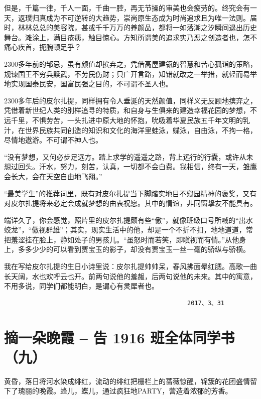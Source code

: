 \documentclass[openany]{ctexbook}
\begin{document}
但是，千篇一律，千人一面，千曲一腔，再无节操的审美也会疲劳的。终究会有一天，返璞归真成为不可逆转的大趋势，崇尚原生态成为时尚追求且为唯一法则。届时，林林总总的美容院，甚或千千万万的养颜品，都将一如落潮之汐瞬间退出历史舞台。滩涂上，满目疮痍，触目惊心。方知所谓美的追求实乃恶之创造者也，怎不痛心疾首，扼腕顿足乎？

2300多年前的邹忌，虽有颜值却摈弃之，凭借高屋建瓴的智慧和苦心孤诣的策略，规谏国王不穷兵黩武，不劳民伤财；只广开言路，知错就改之一举措，就轻而易举地实现国泰民安，国富民强之目的，不可谓不圣人也。

2300多年后的皮尔扎提，同样拥有令人垂涎的天然颜值，同样义无反顾地摈弃之，凭借着新世纪人类的别样追寻的特质，和自身与生俱来的建造幸福花园的梦想，不远千里，不惧劳苦，一头扎进中原大地的怀抱，吮吸着华夏民族五千年文明的乳汁，在世界民族共同创造的知识和文化的海洋里蛙泳，蝶泳，自由泳，不拘一格，尽情地遨游。不可谓不神人也。

``没有梦想，又何必步足远方。踏上求学的遥遥之路，背上远行的行囊，或许从未想过回头。汗水，努力，刻苦，认真，一切都不会白费。我相信，终有一天，雏鹰会长大，会在天空自由地飞翔。''

``最美学生''的推荐词里，既有对皮尔扎提当下脚踏实地目不窥园精神的褒奖，又有对皮尔扎提将来必定会成就梦想的由衷祝愿。其中的情谊，非同窗挚友不能具有。

端详久了，你会感觉，照片里的皮尔扎提颇有些``傲''，就像班级口号所喊的``出水蛟龙''，``傲视群雄''；其实，现实生活中的他，却是一个不折不扣，地地道道，常把羞涩挂在脸上，静如处子的男孩儿。``虽怒时而若笑，即瞋视而有情。''从他身上，多多少少的可以看到贾宝玉的影子，却没有贾宝玉一丝一毫的骄纵与骄横。

我在写给皮尔扎提的生日小诗里说：皮尔扎提帅帅呆，春风拂面晕红腮。高歌一曲长天阔，水也欢呼云也开。前两句说他的羞赧，后两句说他的未来。其中的寓意，不用多说，同学们都能明白，是谓心有灵犀者也。

\begin{verbatim}
                                                   2017、3、31
\end{verbatim}

\chapter*{摘一朵晚霞 -- 告 1916 班全体同学书（九）}\label{letter9}

黄昏，落日将河水染成绯红，流动的绯红把栅栏上的蔷薇惊醒，锦簇的花团盛情留下了瑰丽的晚霞。蜂儿，蝶儿，通过疯狂地PARTY，营造着浓郁的芳香。
\end{document}
